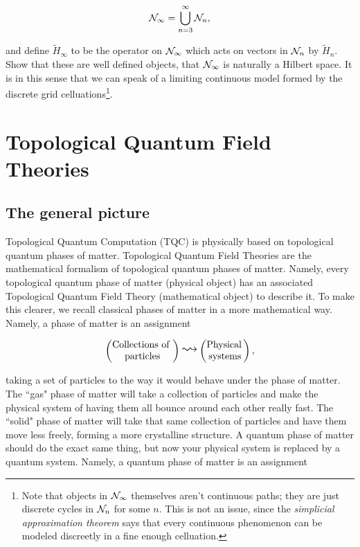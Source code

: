 \documentclass{article}
\theoremstyle{definition}
\numberwithin{figure}{section}
\begin{document}
\begin{enumerate}[\thesection .1.]
$$\mathcal{N}_{\infty}=\bigcup_{n=3}^{\infty}\mathcal{N}_{n},$$

and define $\tilde{H}_{\infty}$ to be the operator on $\mathcal{N}_{\infty}$ which acts on vectors in $\mathcal{N}_{n}$ by $\tilde{H}_n$. Show that these are well defined objects, that $\mathcal{N}_{\infty}$ is naturally a Hilbert space. It is in this sense that we can speak of a limiting continuous model formed by the discrete grid celluations\footnote{Note that objects in $\mathcal{N}_{\infty}$ themselves aren't continuous paths; they are just discrete cycles in $\mathcal{N}_n$ for some $n$. This is not an issue, since the \textit{simplicial approximation theorem} says that every continuous phenomenon can be modeled discreetly in a fine enough celluation.}.
\end{enumerate}

\section{Topological Quantum Field Theories}
\label{TQFTs}

\subsection{The general picture}
\label{The general picture}

Topological Quantum Computation (TQC) is physically based on topological quantum phases of matter. Topological Quantum Field Theories are the mathematical formalism of topological quantum phases of matter. Namely, every topological quantum phase of matter (physical object) has an associated Topological Quantum Field Theory (mathematical object) to describe it. To make this clearer, we recall classical phases of matter in a more mathematical way. Namely, a phase of matter is an assignment

$$
\begin{pmatrix}
\text{Collections of } \\
\text{particles}
\end{pmatrix}
\bigleadsto
\begin{pmatrix}
\text{Physical\,} \\ \text{systems}
\end{pmatrix},
$$

taking a set of particles to the way it would behave under the phase of matter. The ``gas" phase of matter will take a collection of particles and make the physical system of having them all bounce around each other really fast. The ``solid" phase of matter will take that same collection of particles and have them move less freely, forming a more crystalline structure. A quantum phase of matter should do the exact same thing, but now your physical system is replaced by a quantum system. Namely, a quantum phase of matter is an assignment
\end{document}
